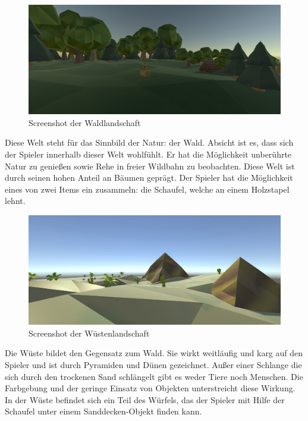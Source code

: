 
\begin{figure}[!htbp]%
	\centering
		\includegraphics[width=1.0\textwidth]{images/Wald}
	\caption{Screenshot der Waldlandschaft}
	\label{fig:Wald}
\end{figure}

Diese Welt steht für das Sinnbild der Natur: der Wald. Absicht ist es, dass sich der Spieler innerhalb dieser Welt wohlfühlt. Er hat die Möglichkeit unberührte Natur zu genießen sowie Rehe in freier Wildbahn zu beobachten. Diese Welt ist durch seinen hohen Anteil an Bäumen geprägt. Der Spieler hat die Möglichkeit eines von zwei Items ein zusammeln: die Schaufel, welche an einem Holzstapel lehnt.


\begin{figure}[!htbp]%
	\centering
		\includegraphics[width=1.0\textwidth]{images/Wueste}
	\caption{Screenshot der Wüstenlandschaft}
	\label{fig:Wueste}
\end{figure}

Die Wüste bildet den Gegensatz zum Wald. Sie wirkt weitläufig und karg auf den Spieler und ist durch Pyramiden und Dünen gezeichnet. Außer einer Schlange die sich durch den trockenen Sand schlängelt gibt es weder Tiere noch Menschen.
Die Farbgebung und der geringe Einsatz von Objekten unterstreicht diese Wirkung. In der Wüste befindet sich ein Teil des Würfels, das der Spieler mit Hilfe der Schaufel unter einem Sanddecken-Objekt finden kann.  

